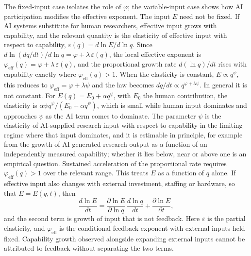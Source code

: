 \documentclass[11pt]{article}
\begin{document}
The fixed-input case isolates the role of $\varphi$; the variable-input case shows how AI participation modifies the effective exponent. The input $E$ need not be fixed. If AI systems substitute for human researchers, effective input grows with capability, and the relevant quantity is the elasticity of effective input with respect to capability, $\varepsilon(q)=d\ln E/d\ln q$. Since $d\ln(dq/dt)/d\ln q=\varphi+\lambda\,\varepsilon(q)$, the local effective exponent is $\varphi_{\mathrm{eff}}(q)=\varphi+\lambda\,\varepsilon(q)$, and the proportional growth rate $d(\ln q)/dt$ rises with capability exactly where $\varphi_{\mathrm{eff}}(q)>1$. When the elasticity is constant, $E\propto q^{\psi}$, this reduces to $\varphi_{\mathrm{eff}}=\varphi+\lambda\psi$ and the law becomes $dq/dt\propto q^{\varphi+\lambda\psi}$. In general it is not constant. For $E(q)=E_0+\alpha q^{\psi}$, with $E_0$ the human contribution, the elasticity is $\alpha\psi q^{\psi}/(E_0+\alpha q^{\psi})$, which is small while human input dominates and approaches $\psi$ as the AI term comes to dominate. The parameter $\psi$ is the elasticity of AI-supplied research input with respect to capability in the limiting regime where that input dominates, and it is estimable in principle, for example from the growth of AI-generated research output as a function of an independently measured capability; whether it lies below, near or above one is an empirical question. Sustained acceleration of the proportional rate requires $\varphi_{\mathrm{eff}}(q)>1$ over the relevant range. This treats $E$ as a function of $q$ alone. If effective input also changes with external investment, staffing or hardware, so that $E=E(q,t)$, then
\[
\frac{d\ln E}{dt}=\frac{\partial\ln E}{\partial\ln q}\,\frac{d\ln q}{dt}+\frac{\partial\ln E}{\partial t},
\]
and the second term is growth of input that is not feedback. Here $\varepsilon$ is the partial elasticity, and $\varphi_{\mathrm{eff}}$ is the conditional feedback exponent with external inputs held fixed. Capability growth observed alongside expanding external inputs cannot be attributed to feedback without separating the two terms.
\end{document}
